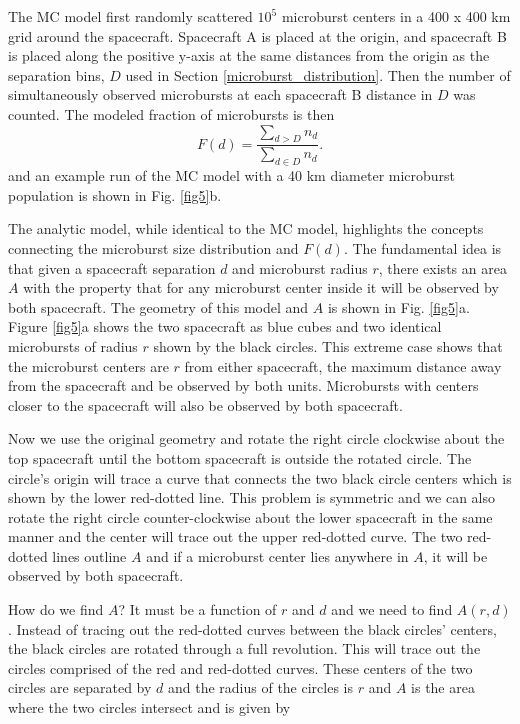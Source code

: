 \documentclass[draft]{agujournal2019}
\begin{document}
The MC model first randomly scattered $10^5$ microburst centers in a 400 x 400 km grid around the spacecraft. Spacecraft A is placed at the origin, and spacecraft B is placed along the positive y-axis at the same distances from the origin as the separation bins, $D$ used in Section \ref{microburst_distribution}. Then the number of simultaneously observed microbursts at each spacecraft B distance in $D$ was counted. The modeled fraction of microbursts is then
\begin{equation}
F(d) = \frac{\sum_{d > D} n_{d} }{\sum_{d \in D} n_{d}}.
\end{equation} and an example run of the MC model with a 40 km diameter microburst population is shown in Fig. \ref{fig5}b.

The analytic model, while identical to the MC model, highlights the concepts connecting the microburst size distribution and $F(d)$. The fundamental idea is that given a spacecraft separation $d$ and microburst radius $r$, there exists an area $A$ with the property that for any microburst center inside it will be observed by both spacecraft. The geometry of this model and $A$ is shown in Fig. \ref{fig5}a. Figure \ref{fig5}a shows the two spacecraft as blue cubes and two identical microbursts of radius $r$ shown by the black circles. This extreme case shows that the microburst centers are $r$ from either spacecraft, the maximum distance away from the spacecraft and be observed by both units. Microbursts with centers closer to the spacecraft will also be observed by both spacecraft. 

Now we use the original geometry and rotate the right circle clockwise about the top spacecraft until the bottom spacecraft is outside the rotated circle. The circle's origin will trace a curve that connects the two black circle centers which is shown by the lower red-dotted line. This problem is symmetric and we can also rotate the right circle counter-clockwise about the lower spacecraft in the same manner and the center will trace out the upper red-dotted curve. The two red-dotted lines outline $A$ and if a microburst center lies anywhere in $A$, it will be observed by both spacecraft. 

How do we find $A$? It must be a function of $r$ and $d$ and we need to find $A(r, d)$. Instead of tracing out the red-dotted curves between the black circles' centers, the black circles are rotated through a full revolution. This will trace out the circles comprised of the red and red-dotted curves. These centers of the two circles are separated by $d$ and the radius of the circles is $r$ and $A$ is the area where the two circles intersect and is given by 
\end{document}
